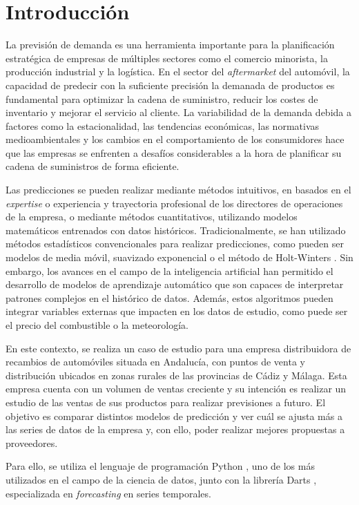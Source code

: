 \chapter{Introducción}\label{cap1}

La previsión de demanda es una herramienta importante para la planificación estratégica de empresas de múltiples sectores como el comercio minorista, la producción industrial y la logística. En el sector del \textit{aftermarket} del automóvil, la capacidad de predecir con la suficiente precisión la demanada de productos es fundamental para optimizar la cadena de suministro, reducir los costes de inventario y mejorar el servicio al cliente. La variabilidad de la demanda debida a factores como la estacionalidad, las tendencias económicas, las normativas medioambientales y los cambios en el comportamiento de los consumidores hace que las empresas se enfrenten a desafíos considerables a la hora de planificar su cadena de suministros de forma eficiente.

Las predicciones se pueden realizar mediante métodos intuitivos, en basados en el \textit{expertise} o experiencia y trayectoria profesional de los directores de operaciones de la empresa, o mediante métodos cuantitativos, utilizando modelos matemáticos entrenados con datos históricos. Tradicionalmente, se han utilizado métodos estadísticos convencionales para realizar predicciones, como pueden ser modelos de media móvil, suavizado exponencial o el método de Holt-Winters \cite{winters}. Sin embargo, los avances en el campo de la inteligencia artificial han permitido el desarrollo de modelos de aprendizaje automático que son capaces de interpretar patrones complejos en el histórico de datos. Además, estos algoritmos pueden integrar variables externas que impacten en los datos de estudio, como puede ser el precio del combustible o la meteorología.

En este contexto, se realiza un caso de estudio para una empresa distribuidora de recambios de automóviles situada en Andalucía, con puntos de venta y distribución ubicados en zonas rurales de las provincias de Cádiz y Málaga. Esta empresa cuenta con un volumen de ventas creciente y su intención es realizar un estudio de las ventas de sus productos para realizar previsiones a futuro. El objetivo es comparar distintos modelos de predicción y ver cuál se ajusta más a las series de datos de la empresa y, con ello, poder realizar mejores propuestas a proveedores. 

Para ello, se utiliza el lenguaje de programación Python \cite{python}, uno de los más utilizados en el campo de la ciencia de datos, junto con la librería Darts \cite{darts}, especializada en \textit{forecasting} en series temporales.

